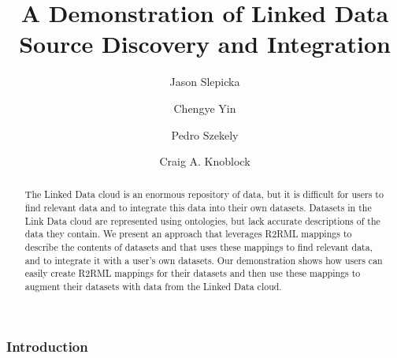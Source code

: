 \documentclass[runningheads,a4paper]{llncs}
\begin{document}
\mainmatter  %

\title{A Demonstration of Linked Data Source Discovery and Integration}


%
\author{Jason Slepicka%
\and Chengye Yin\and Pedro Szekely\and Craig A. Knoblock}
%


\maketitle


\begin{abstract}
The Linked Data cloud is an enormous repository of data, but it is difficult for users to find relevant data and to integrate this data into their own datasets. 
Datasets in the Link Data cloud are represented using ontologies, but lack accurate descriptions of the data they contain.
We present an approach that leverages R2RML mappings to describe the contents of datasets and that uses these mappings to find relevant data, and to integrate it with a user's own datasets.
Our demonstration shows how users can easily create R2RML mappings for their datasets and then use these mappings to augment their datasets with data from the Linked Data cloud.
\end{abstract}

\subsubsection*{Introduction} 

\end{document}

